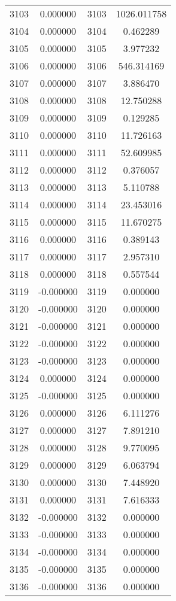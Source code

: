 \documentclass[12pt]{article}
\begin{document}
\begin{longtable}{@{}cccc@{}}
3103 & 0.000000 & 3103 & 1026.011758 \\
3104 & 0.000000 & 3104 & 0.462289 \\
3105 & 0.000000 & 3105 & 3.977232 \\
3106 & 0.000000 & 3106 & 546.314169 \\
3107 & 0.000000 & 3107 & 3.886470 \\
3108 & 0.000000 & 3108 & 12.750288 \\
3109 & 0.000000 & 3109 & 0.129285 \\
3110 & 0.000000 & 3110 & 11.726163 \\
3111 & 0.000000 & 3111 & 52.609985 \\
3112 & 0.000000 & 3112 & 0.376057 \\
3113 & 0.000000 & 3113 & 5.110788 \\
3114 & 0.000000 & 3114 & 23.453016 \\
3115 & 0.000000 & 3115 & 11.670275 \\
3116 & 0.000000 & 3116 & 0.389143 \\
3117 & 0.000000 & 3117 & 2.957310 \\
3118 & 0.000000 & 3118 & 0.557544 \\
3119 & -0.000000 & 3119 & 0.000000 \\
3120 & -0.000000 & 3120 & 0.000000 \\
3121 & -0.000000 & 3121 & 0.000000 \\
3122 & -0.000000 & 3122 & 0.000000 \\
3123 & -0.000000 & 3123 & 0.000000 \\
3124 & 0.000000 & 3124 & 0.000000 \\
3125 & -0.000000 & 3125 & 0.000000 \\
3126 & 0.000000 & 3126 & 6.111276 \\
3127 & 0.000000 & 3127 & 7.891210 \\
3128 & 0.000000 & 3128 & 9.770095 \\
3129 & 0.000000 & 3129 & 6.063794 \\
3130 & 0.000000 & 3130 & 7.448920 \\
3131 & 0.000000 & 3131 & 7.616333 \\
3132 & -0.000000 & 3132 & 0.000000 \\
3133 & -0.000000 & 3133 & 0.000000 \\
3134 & -0.000000 & 3134 & 0.000000 \\
3135 & -0.000000 & 3135 & 0.000000 \\
3136 & -0.000000 & 3136 & 0.000000 \\

\end{longtable}
\end{document}
